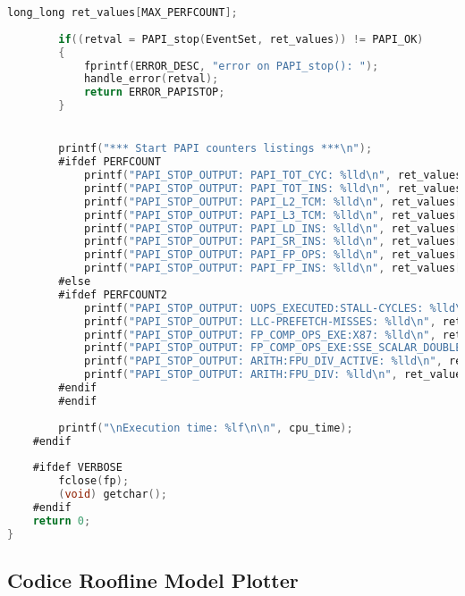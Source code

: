 \begin{lstlisting}[language=C,breaklines=true]
		long_long ret_values[MAX_PERFCOUNT];
		
		if((retval = PAPI_stop(EventSet, ret_values)) != PAPI_OK)
		{
			fprintf(ERROR_DESC, "error on PAPI_stop(): ");
			handle_error(retval);	
			return ERROR_PAPISTOP;
		}


		printf("*** Start PAPI counters listings ***\n");
		#ifdef PERFCOUNT
			printf("PAPI_STOP_OUTPUT: PAPI_TOT_CYC: %lld\n", ret_values[PAPI_TOTCYC]);
			printf("PAPI_STOP_OUTPUT: PAPI_TOT_INS: %lld\n", ret_values[PAPI_TOTINS]);
			printf("PAPI_STOP_OUTPUT: PAPI_L2_TCM: %lld\n", ret_values[PAPI_L2TCM]);
			printf("PAPI_STOP_OUTPUT: PAPI_L3_TCM: %lld\n", ret_values[PAPI_L3TCM]);
			printf("PAPI_STOP_OUTPUT: PAPI_LD_INS: %lld\n", ret_values[PAPI_LDINS]);
			printf("PAPI_STOP_OUTPUT: PAPI_SR_INS: %lld\n", ret_values[PAPI_SRINS]);
			printf("PAPI_STOP_OUTPUT: PAPI_FP_OPS: %lld\n", ret_values[PAPI_FPOPS]);
			printf("PAPI_STOP_OUTPUT: PAPI_FP_INS: %lld\n", ret_values[PAPI_FPINS]);
		#else
		#ifdef PERFCOUNT2
			printf("PAPI_STOP_OUTPUT: UOPS_EXECUTED:STALL-CYCLES: %lld\n", ret_values[PAPI_UOPSEXECUTEDSTALLCYCLES]);
			printf("PAPI_STOP_OUTPUT: LLC-PREFETCH-MISSES: %lld\n", ret_values[PAPI_LLCPREFETCHMISSESPREFETCH]);
			printf("PAPI_STOP_OUTPUT: FP_COMP_OPS_EXE:X87: %lld\n", ret_values[PAPI_FPCOMPOPSEXEX87]);
			printf("PAPI_STOP_OUTPUT: FP_COMP_OPS_EXE:SSE_SCALAR_DOUBLE: %lld\n", ret_values[PAPI_FPCOMPOPSEXESSESCALARDOUBLE]);		
			printf("PAPI_STOP_OUTPUT: ARITH:FPU_DIV_ACTIVE: %lld\n", ret_values[PAPI_ARITHFPUDIVACTIVE]);
			printf("PAPI_STOP_OUTPUT: ARITH:FPU_DIV: %lld\n", ret_values[PAPI_ARITHFPUDIV]);
		#endif
		#endif
		
		printf("\nExecution time: %lf\n\n", cpu_time);
	#endif
	
	#ifdef VERBOSE
		fclose(fp);
		(void) getchar();
	#endif
	return 0;
}

\end{lstlisting}

\subsection{Codice Roofline Model Plotter}

